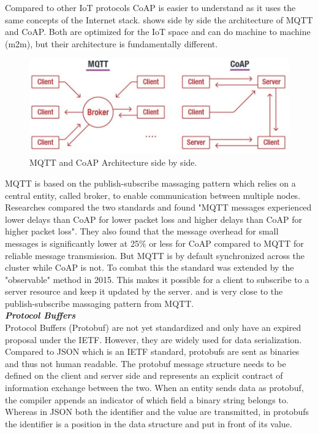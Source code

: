 Compared to other IoT protocols CoAP is easier to understand as it uses the same concepts of the Internet stack.  shows side by side the architecture of MQTT and CoAP. Both are optimized for the IoT space and can do machine to machine (m2m), but their architecture is fundamentally different.
\begin{figure}[h!]
    \centering
    \includegraphics[scale=0.45]{figures/mqtt-vs-coap.jpg}
    \caption{MQTT and CoAP Architecture side by side\cite{COAPvsMQTT27:online}.}
    \label{fig:mqttVsCoap}
\end{figure}
MQTT is based on the publish-subscribe massaging pattern which relies on a central entity, called broker, to enable communication between multiple nodes. Researches compared the two standards and found "MQTT messages experienced lower delays than CoAP for lower packet loss and higher delays than CoAP for higher packet loss"\cite{MQTTvsCoAPAnalysisIEEE}. They also found that the message overhead for small messages is significantly lower at 25\% or less for CoAP compared to MQTT for reliable message transmission. But MQTT is by default synchronized across the cluster while CoAP is not. To combat this the standard was extended by the "observable" method in 2015\cite{RFC7641observableCoAP}. This makes it possible for a client to subscribe to a server resource and keep it updated by the server. and is very close to the publish-subscribe massaging pattern from MQTT.\\[5mm]
{\textbf{\textit{Protocol Buffers}}}\\
Protocol Buffers (Protobuf) are not yet standardized and only have an expired proposal under the IETF\cite{rfernando-protocol-buffers-00}. However, they are widely used for data serialization. Compared to JSON which is an IETF standard, protobufs are sent as binaries and thus not human readable. The protobuf message structure needs to be defined on the client and server side and represents an explicit contract of information exchange between the two. When an entity sends data as protobuf, the compiler appends an indicator of which field a binary string belongs to. Whereas in JSON both the identifier and the value are transmitted, in protobufs the identifier is a position in the data structure and put in front of its value.
